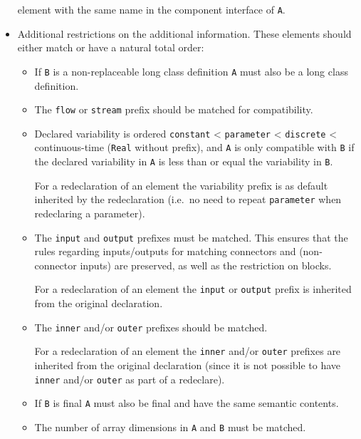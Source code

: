 \begin{itemize}
  element with the same name in the component interface of \lstinline!A!.
\item
  Additional restrictions on the additional information.  These elements should either match or have a natural total order:
  \begin{itemize}
  \item
    If \lstinline!B! is a non-replaceable long class definition \lstinline!A! must also be a
    long class definition.
  \item
    The \lstinline!flow! or \lstinline!stream! prefix should be matched for compatibility.
  \item
    Declared variability is ordered \lstinline!constant! \textless{} \lstinline!parameter! \textless{} \lstinline!discrete! \textless{} continuous-time (\lstinline!Real! without prefix), and \lstinline!A! is only compatible with \lstinline!B! if the declared variability in \lstinline!A! is less than or equal the variability in \lstinline!B!.
    \begin{nonnormative}
    For a redeclaration of an element the variability prefix is as default inherited by the redeclaration (i.e.\ no need to repeat \lstinline!parameter! when redeclaring a parameter).
    \end{nonnormative}
  \item
    The \lstinline!input! and \lstinline!output! prefixes must be matched.  This ensures that the rules regarding inputs/outputs for matching connectors and (non-connector inputs) are preserved, as well as the restriction on blocks.
    \begin{nonnormative}
    For a redeclaration of an element the \lstinline!input! or \lstinline!output! prefix is inherited from the original declaration.
    \end{nonnormative}
  \item
    The \lstinline!inner! and/or \lstinline!outer! prefixes should be matched.
    \begin{nonnormative}
    For a redeclaration of an element the \lstinline!inner! and/or \lstinline!outer! prefixes are inherited from the original declaration (since it is not
    possible to have \lstinline!inner! and/or \lstinline!outer! as part of a redeclare).
    \end{nonnormative}
  \item
    If \lstinline!B! is final \lstinline!A! must also be final and have the same semantic
    contents.
  \item
    The number of array dimensions in \lstinline!A! and \lstinline!B! must be matched.

\end{itemize}
\end{itemize}
